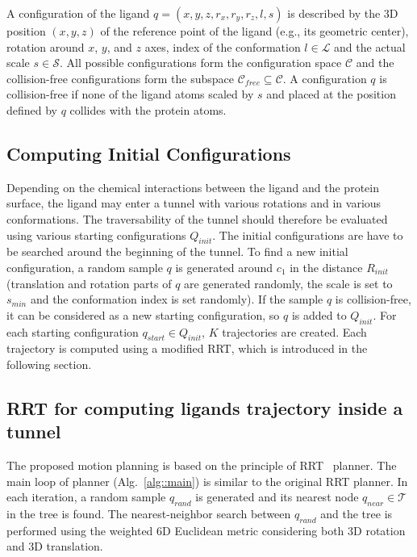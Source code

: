 \documentclass[usletter, 10pt, conference]{ieeeconf} %
\def\qrand{q_{rand}}
\def\qstart{q_{start}}
\def\qinit{\qstart}
\def\qgoal{q_{goal}}
\def\qnear{q_{near}}
\def\T{\mathcal{T}}
\def\C{\mathcal{C}}
\def\CF{\mathcal{C}_{free}}
\def\CFD{{\mathcal{C}^s_{free}}}
\def\QI{Q_{init}}
\def\RI{R_{init}}
\def\smin{s_{min}}
\def\L{\mathcal{L}}
\def\S{\mathcal{S}}
\begin{document}
A configuration of the ligand $q=(x,y,z,r_x,r_y,r_z,l,s)$  is described
by the 3D position $(x,y,z)$ of the reference point of the ligand (e.g., its geometric center), rotation around $x$, $y$, and $z$ axes,
index of the conformation $l\in \L$ and the actual scale $s \in \S$.
All possible configurations form the configuration space $\C$ and the collision-free configurations
form the subspace $\CF \subseteq \C$.
A configuration $q$ is collision-free if none of the ligand atoms scaled by $s$ and placed at the
position defined by $q$ collides with the protein atoms.


\subsection{Computing Initial Configurations}

Depending on the chemical interactions between the ligand and the protein surface, the ligand may enter a tunnel with various rotations and in various conformations.
The traversability of the tunnel should therefore be evaluated using various starting configurations $\QI$.
The initial configurations are have to be searched around the beginning of the tunnel.
To find a new initial configuration, a random sample $q$ is generated around $c_1$ in the distance $\RI$ (translation and rotation
 parts of $q$ are generated randomly, the scale is set to $\smin$ and the conformation index is set randomly).
If the sample $q$ is collision-free, it can be considered as a new starting configuration, so $q$ is added to $\QI$.
For each starting configuration $\qinit \in \QI$,  $K$ trajectories are created.
Each trajectory is computed using a modified RRT, which is introduced in the following section.


\subsection{RRT for computing ligands trajectory inside a tunnel}

The proposed motion planning is based on the principle of RRT~\cite{lavalleRRT} planner.
The main loop of planner (Alg.~\ref{alg::main}) is similar to the original RRT planner.
In each iteration, a random sample $\qrand$ is generated and its nearest node $\qnear\in\T$ in the tree is found.
The nearest-neighbor search between $\qrand$ and the tree is performed using the weighted 6D Euclidean metric considering
both 3D rotation and 3D translation.
\end{document}

